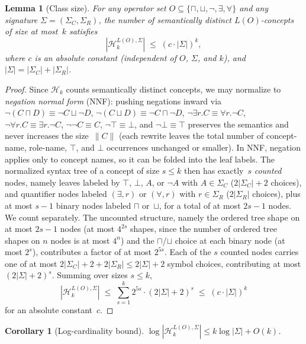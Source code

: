 \documentclass[accepted]{uai2026} %
\newtheorem{lemma}[theorem]{Lemma}
\newtheorem{corollary}[theorem]{Corollary}
\theoremstyle{definition}
\theoremstyle{remark}
\begin{document}
\begin{lemma}[Class size]\label{lem:class-size}
  For any operator set
  $O \subseteq \{\sqcap, \sqcup, \neg, \exists, \forall\}$ and
  any signature $\Sigma = (\Sigma_C, \Sigma_R)$, the number of
  semantically distinct $L(O)$-concepts of size at most~$k$ satisfies
  \[
    |\mathcal{H}_k^{L(O),\Sigma}| \;\leq\; (c \cdot |\Sigma|)^k,
  \]
  where $c$ is an absolute constant (independent of $O$, $\Sigma$,
  and $k$), and $|\Sigma| = |\Sigma_C| + |\Sigma_R|$.
\end{lemma}

\begin{proof}
  Since $\mathcal{H}_k$ counts semantically
  distinct concepts, we may normalize to \emph{negation normal
  form} (NNF): pushing negations inward via
  $\neg(C \sqcap D) \equiv \neg C \sqcup \neg D$,
  $\neg(C \sqcup D) \equiv \neg C \sqcap \neg D$,
  $\neg \exists r.C \equiv \forall r.\neg C$,
  $\neg \forall r.C \equiv \exists r.\neg C$,
  $\neg\neg C \equiv C$, $\neg\top \equiv \bot$, and
  $\neg\bot \equiv \top$ preserves the semantics and never
  increases the size~$\|C\|$ (each rewrite leaves the total number of
  concept-name, role-name, $\top$, and $\bot$ occurrences
  unchanged or smaller). In NNF, negation applies only
  to concept names, so it can be folded into the leaf labels. The
  normalized syntax tree of a concept of size $s \leq k$ then has
  exactly~$s$ \emph{counted} nodes, namely leaves labeled by $\top$,
  $\bot$, $A$, or $\neg A$ with $A \in \Sigma_C$
  ($2|\Sigma_C| + 2$ choices), and quantifier nodes labeled
  $(\exists, r)$ or $(\forall, r)$ with $r \in \Sigma_R$
  ($2|\Sigma_R|$ choices), plus at most $s - 1$ binary nodes
  labeled $\sqcap$ or~$\sqcup$, for a total of at most $2s - 1$
  nodes.
  We count separately. The uncounted structure, namely the ordered tree
  shape on at most $2s - 1$ nodes (at most $4^{2s}$ shapes, since the
  number of ordered tree shapes on $n$ nodes is at most $4^n$) and the $\sqcap$/$\sqcup$
  choice at each binary node (at most $2^{s}$), contributes a
  factor of at most $2^{5s}$. Each of the $s$ counted nodes
  carries one of at most
  $2|\Sigma_C| + 2 + 2|\Sigma_R| \leq 2|\Sigma| + 2$ symbol
  choices, contributing at most $(2|\Sigma| + 2)^s$. Summing over
  sizes $s \leq k$,
  \[
    |\mathcal{H}_k^{L(O),\Sigma}|
    \;\leq\; \sum_{s=1}^{k} 2^{5s} \cdot (2|\Sigma| + 2)^s
    \;\leq\; (c \cdot |\Sigma|)^k
  \]
  for an absolute constant~$c$.
\end{proof}

\begin{corollary}[Log-cardinality
bound]\label{cor:log-class}
  $\log |\mathcal{H}_k^{L(O),\Sigma}|
  \leq k \log|\Sigma| + O(k)$.
\end{corollary}
\end{document}
